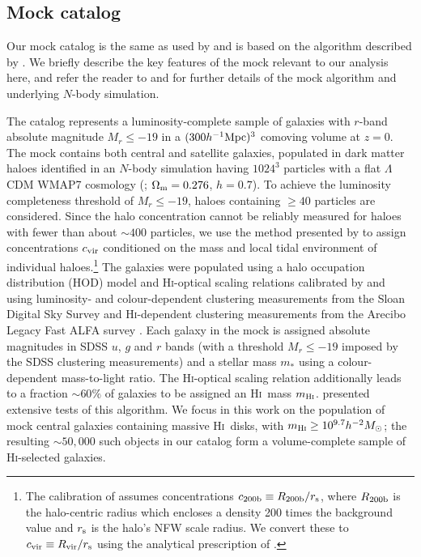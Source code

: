 \documentclass[usenatbib]{mnras}
\newcommand{\Hi}{\textsc{Hi}}
\newcommand{\Mhsq}{\ensuremath{h^{-2}M_{\odot}}}
\newcommand{\Mpch}{\ensuremath{h^{-1}{\rm Mpc}}}
\begin{document}
\subsection{Mock catalog}
\label{subsec:mock}
%
Our mock catalog is the same as used by  and is based on the algorithm described by \citet[][hereafter, PCS21]{pcs21}. We briefly describe the key features of the mock relevant to our analysis here, and refer the reader to  and  for further details of the mock algorithm and underlying $N$-body simulation.

The catalog represents a luminosity-complete sample of galaxies with $r$-band absolute magnitude $M_r\leq-19$ in a $(300\Mpch)^3$ comoving volume at $z=0$. The mock contains both central and satellite galaxies, populated in dark matter  haloes identified in an $N$-body simulation having $1024^3$ particles with a flat $\Lambda$CDM WMAP7 cosmology (\citealp{komatsu+2011}; $\Omega_{\rm m}=0.276$, $h=0.7$). To achieve the luminosity completeness threshold of $M_r\leq-19$, haloes containing $\geq40$ particles are considered. Since the halo concentration cannot be reliably measured for haloes with fewer than about $\sim400$ particles, we use the method presented by \citet{rps21} to assign concentrations $c_{\rm vir}$ \citep[assuming][NFW profiles]{nfw96} conditioned on the mass and local tidal environment of individual haloes.\footnote{The calibration of \citet{rps21} assumes concentrations $c_{\rm 200b}\equiv R_{\rm 200b}/r_{\rm s}$, where $R_{\rm 200b}$ is the halo-centric radius which encloses a density 200 times the background value and $r_{\rm s}$ is the halo's NFW scale radius. We convert these to $c_{\rm vir}\equiv R_{\rm vir}/r_{\rm s}$ using the analytical prescription of \citet{hk03}.} The galaxies were populated using a halo occupation distribution (HOD) model and \Hi-optical scaling relations calibrated by \citet{pcp18} and \citet{ppp19} using luminosity- and colour-dependent clustering measurements from the Sloan Digital Sky Survey \citep[SDSS,][]{york+00,zehavi+11} and \Hi-dependent clustering measurements from the Arecibo Legacy Fast ALFA survey \citep[ALFALFA,][]{giovanelli+05,guo+17}. Each galaxy in the mock is assigned absolute magnitudes in SDSS $u$, $g$ and $r$ bands (with a threshold $M_r\leq-19$ imposed by the SDSS clustering measurements) and a stellar mass $m_\ast$ using a colour-dependent mass-to-light ratio. The \Hi-optical scaling relation additionally leads to a fraction $\sim60\%$ of galaxies to be  assigned an \Hi\ mass $m_{\Hi}$.  presented extensive tests of this algorithm. 
We focus in this work on the population of mock central galaxies containing massive \Hi\ disks, with $m_{\Hi}\geq10^{9.7}\Mhsq$; the resulting $\sim50,000$ such objects in our catalog form a volume-complete sample of \Hi-selected galaxies.
\end{document}
